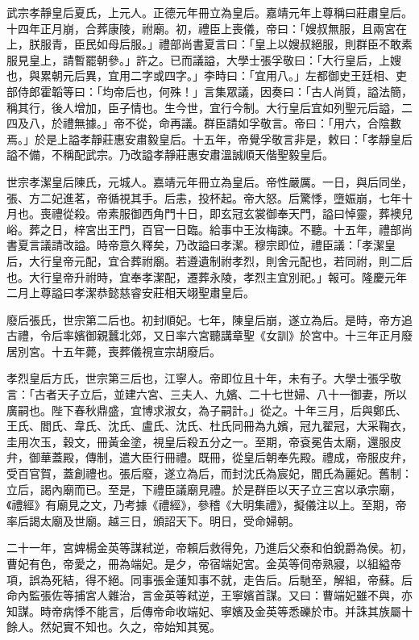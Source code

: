 武宗孝靜皇后夏氏，上元人。正德元年冊立為皇后。嘉靖元年上尊稱曰莊肅皇后。十四年正月崩，合葬康陵，祔廟。初，禮臣上喪儀，帝曰：「嫂叔無服，且兩宮在上，朕服青，臣民如母后服。」禮部尚書夏言曰：「皇上以嫂叔絕服，則群臣不敢素服見皇上，請暫罷朝參。」許之。已而議謚，大學士張孚敬曰：「大行皇后，上嫂也，與累朝元后異，宜用二字或四字。」李時曰：「宜用八。」左都御史王廷相、吏部侍郎霍韜等曰：「均帝后也，何殊！」言集眾議，因奏曰：「古人尚質，謚法簡，稱其行，後人增加，臣子情也。生今世，宜行今制。大行皇后宜如列聖元后謚，二四及八，於禮無據。」帝不從，命再議。群臣請如孚敬言。帝曰：「用六，合陰數焉。」於是上謚孝靜莊惠安肅毅皇后。十五年，帝覺孚敬言非是，敕曰：「孝靜皇后謚不備，不稱配武宗。乃改謚孝靜莊惠安肅溫誠順天偕聖毅皇后。

世宗孝潔皇后陳氏，元城人。嘉靖元年冊立為皇后。帝性嚴厲。一日，與后同坐，張、方二妃進茗，帝循視其手。后恚，投杯起。帝大怒。后驚悸，墮娠崩，七年十月也。喪禮從殺。帝素服御西角門十日，即玄冠玄裳御奉天門，謚曰悼靈，葬襖兒峪。葬之日，梓宮出王門，百官一日臨。給事中王汝梅諫。不聽。十五年，禮部尚書夏言議請改謚。時帝意久釋矣，乃改謚曰孝潔。穆宗即位，禮臣議：「孝潔皇后，大行皇帝元配，宜合葬祔廟。若遵遺制祔孝烈，則舍元配也，若同祔，則二后也。大行皇帝升祔時，宜奉孝潔配，遷葬永陵，孝烈主宜別祀。」報可。隆慶元年二月上尊謚曰孝潔恭懿慈睿安莊相天翊聖肅皇后。

廢后張氏，世宗第二后也。初封順妃。七年，陳皇后崩，遂立為后。是時，帝方追古禮，令后率嬪御親蠶北郊，又日率六宮聽講章聖《女訓》於宮中。十三年正月廢居別宮。十五年薨，喪葬儀視宣宗胡廢后。

孝烈皇后方氏，世宗第三后也，江寧人。帝即位且十年，未有子。大學士張孚敬言：「古者天子立后，並建六宮、三夫人、九嬪、二十七世婦、八十一御妻，所以廣嗣也。陛下春秋鼎盛，宜博求淑女，為子嗣計。」從之。十年三月，后與鄭氏、王氏、閻氏、韋氏、沈氏、盧氏、沈氏、杜氏同冊為九嬪，冠九翟冠，大采鞠衣，圭用次玉，穀文，冊黃金塗，視皇后殺五分之一。至期，帝袞冕告太廟，還服皮弁，御華蓋殿，傳制，遣大臣行冊禮。既冊，從皇后朝奉先殿。禮成，帝服皮弁，受百官賀，蓋創禮也。張后廢，遂立為后，而封沈氏為宸妃，閻氏為麗妃。舊制：立后，謁內廟而已。至是，下禮臣議廟見禮。於是群臣以天子立三宮以承宗廟，《禮經》有廟見之文，乃考據《禮經》，參稽《大明集禮》，擬儀注以上。至期，帝率后謁太廟及世廟。越三日，頒詔天下。明日，受命婦朝。

二十一年，宮婢楊金英等謀弒逆，帝賴后救得免，乃進后父泰和伯銳爵為侯。初，曹妃有色，帝愛之，冊為端妃。是夕，帝宿端妃宮。金英等伺帝熟寢，以組縊帝項，誤為死結，得不絕。同事張金蓮知事不就，走告后。后馳至，解組，帝蘇。后命內監張佐等捕宮人雜治，言金英等弒逆，王寧嬪首謀。又曰：曹端妃雖不與，亦知謀。時帝病悸不能言，后傳帝命收端妃、寧嬪及金英等悉礫於市。并誅其族屬十餘人。然妃實不知也。久之，帝始知其冤。

